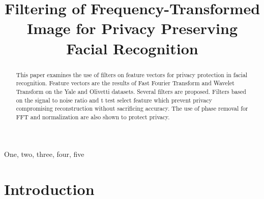 \documentclass{article}
\title{Filtering of Frequency-Transformed Image 
for Privacy Preserving Facial Recognition}
\begin{document}
%

\maketitle
%
\begin{abstract}
This paper examines the use of filters on feature vectors for 
privacy protection in facial recognition. Feature vectors are 
the results of Fast Fourier Transform and Wavelet Transform on 
the Yale and Olivetti datasets. Several filters are proposed. 
Filters based on the signal to noise ratio and t test select 
feature which prevent privacy compromising reconstruction without 
sacrificing accuracy. The use of phase removal for FFT and 
normalization are also shown to protect privacy.   
\end{abstract}
%
\begin{keywords}
One, two, three, four, five
\end{keywords}
%
\section{Introduction}
\label{sec:intro}
\end{document}
